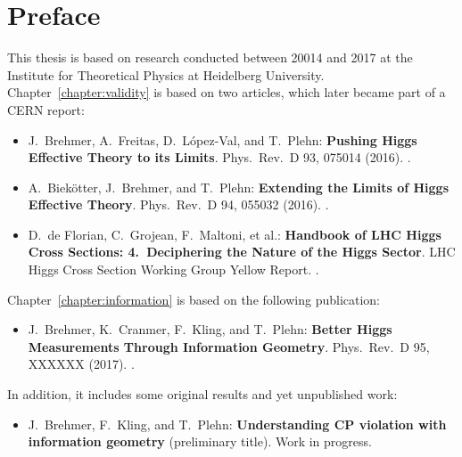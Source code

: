 
\chapter*{Preface}
\label{chapter:preface}

This thesis is based on research conducted between 20014 and 2017 at
the Institute for Theoretical Physics at Heidelberg
University. Chapter~\ref{chapter:validity} is based on two articles,
which later became part of a CERN report:
%
\begin{itemize}
  \item[\cite{Brehmer:2015rna}] J.~Brehmer, A.~Freitas, D.~L\'opez-Val, and T.~Plehn:\newline
	\textbf{Pushing Higgs Effective Theory to its Limits}.\newline
	Phys.~Rev.~D 93, 075014 (2016). .
  \item[\cite{Biekotter:2016ecg}] A.~Biek\"otter, J.~Brehmer, and T.~Plehn:\newline
	\textbf{Extending the Limits of Higgs Effective Theory}.\newline
	Phys.~Rev.~D 94, 055032 (2016). . 
  \item[\cite{deFlorian:2016spz}] D.~de Florian, C.~Grojean, F.~Maltoni, et al.:\newline
        \textbf{Handbook of LHC Higgs Cross Sections: 4.~Deciphering the Nature of the Higgs Sector}.\newline
        LHC Higgs Cross Section Working Group Yellow Report. .
\end{itemize}
%
Chapter~\ref{chapter:information} is based on the following publication:
%
\begin{itemize}
  \item[\cite{Brehmer:2016nyr}] J.~Brehmer, K.~Cranmer, F.~Kling, and T.~Plehn:\newline
	\textbf{Better Higgs Measurements Through Information Geometry}.\newline
       Phys.~Rev.~D 95, XXXXXX (2017). .
\end{itemize}
%
In addition, it includes some original results and yet unpublished
work:
%
\begin{itemize}
  \item[\cite{Brehmer:CPV_information}] J.~Brehmer, F.~Kling, and T.~Plehn:\newline
    \textbf{Understanding CP violation with information geometry} (preliminary title).\newline
    Work in progress.
\end{itemize}

